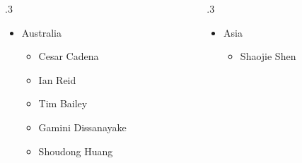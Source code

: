 \begin{frame}
\begin{columns}[T]
\begin{column}{.3\textwidth}
\begin{itemize}
\begin{itemize}
                    \item Cyrill Stachnis
                    \item José Luis Blanco Claraco
                \end{itemize}
                \item Australia
                \begin{itemize}
                    \item Cesar Cadena
                    \item Ian Reid
                    \item Tim Bailey
                    \item Gamini Dissanayake
                    \item Shoudong Huang
                \end{itemize}
            \end{itemize}
        \end{column}%
    \hfill%
    \begin{column}{.3\textwidth}
        \begin{itemize} 
            \item Asia
            \begin{itemize}     
                \item Shaojie Shen
            \end{itemize}
        \end{itemize}
    \end{column}%
    \end{columns}    
\end{frame}

